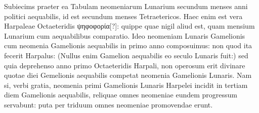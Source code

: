\begin{table}[htbp]
 
\end{table}

Subiecims praeter ea Tabulam neomeniarum Lunarium secundum
menses anni politici aequabilis, id est secundum menses Tetraetericos.
Haec enim est vera Harpaleae Octaeteridis \textgreek{ψηφοφορία[?]}:
 quippe
quae nigil aliud est, quam mensium Lunarium cum aequabilibus
comparatio.
Ideo neomeniam Lunaris Gamelionis cum neomenia
Gamelionis aequabilis in primo anno composuimus: non quod
ita fecerit Harpalus: (Nullus enim Gamelion aequabilis eo seculo
Lunaris fuit:) sed quia deprehenso anno primo Octaeteridis Harpali,
non operosum erit divinare quotae diei Gemelionis aequabilis
competat neomenia Gamelionis Lunaris.
Nam si, verbi gratia,
neomenia primi Gamelionis Lunaris Harpelei incidit in tertiam
diem Gamelionis aequabilis, reliquae omnes neomeniae eundem progressum
servabunt: puta per triduum omnes neomeniae promovendae
erunt.

